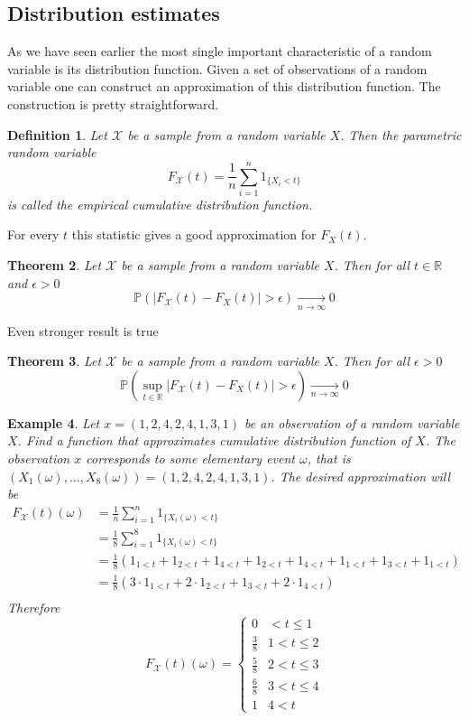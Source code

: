 \documentclass[12pt]{article}
\newtheorem{theorem}{Theorem}[subsection]
\newtheorem{definition}[theorem]{Definition}
\newtheorem{example}[theorem]{Example}
\begin{document}
\subsection{Distribution estimates}

As we have seen earlier the most single important characteristic of a random variable is its distribution function. Given a set of observations of a random variable one can construct an approximation of this distribution function. The construction is pretty straightforward. 

\begin{definition} Let $\mathscr{X}$ be a sample from a random variable $X$. Then the parametric random variable
$$
F_{\mathscr{X}}(t)=\frac{1}{n}\sum_{i=1}^n 1_{\{X_i<t\}}
$$
is called the empirical cumulative distribution function.
\end{definition}

For every $t$ this statistic gives a good approximation for $F_X(t)$. 

\begin{theorem} Let $\mathscr{X}$ be a sample from a random variable $X$. Then for all $t\in\mathbb{R}$ and $\epsilon>0$
$$
\mathbb{P}(|F_{\mathscr{X}}(t)-F_X(t)|>\epsilon)\underset{n\to\infty}{\to}0
$$
\end{theorem}

Even stronger result is true

\begin{theorem} Let $\mathscr{X}$ be a sample from a random variable $X$. Then for all $\epsilon>0$
$$
\mathbb{P}\left(\sup_{t\in\mathbb{R}}|F_{\mathscr{X}}(t)-F_X(t)|>\epsilon\right)\underset{n\to\infty}{\to}0
$$
\end{theorem}

\begin{example} Let $x=(1,2,4,2,4,1,3,1)$ be an observation of a random variable $X$. Find a function that approximates cumulative distribution function of $X$. The observation $x$ corresponds to some elementary event $\omega$, that is $(X_1(\omega),\ldots,X_{8}(\omega))=(1,2,4,2,4,1,3,1)$. The desired approximation will be
\begin{align*}
F_{\mathscr{X}}(t)(\omega)
&=\frac{1}{n}\sum_{i=1}^{n} 1_{\{X_i(\omega)<t\}}\\
&=\frac{1}{8}\sum_{i=1}^{8} 1_{\{X_i(\omega)<t\}}\\
&=\frac{1}{8}\left(1_{1<t}+1_{2<t}+1_{4<t}+1_{2<t}+1_{4<t}+1_{1<t}+1_{3<t}+1_{1<t}\right)\\
&=\frac{1}{8}\left(3\cdot 1_{1<t}+2\cdot 1_{2<t}+1_{3<t}+2\cdot 1_{4<t}\right)\\
\end{align*}
Therefore
$$
F_{\mathscr{X}}(t)(\omega)
=\begin{cases}
0 &  < t \leq 1 \\
\frac{3}{8} & 1 < t \leq 2 \\
\frac{5}{8} & 2 < t \leq 3 \\
\frac{6}{8} & 3 < t \leq 4 \\
1 & 4 < t 
\end{cases}
$$
\end{example}
\end{document}
